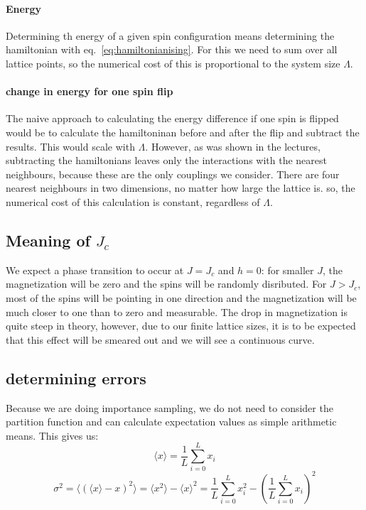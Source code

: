 \documentclass{scrartcl}
\begin{document}
\paragraph{Energy}
Determining th energy of a given spin configuration means determining the hamiltonian with eq.~\ref{eq:hamiltonianising}. For this we need to sum over all lattice points, so the numerical cost of this is proportional to the system size $\Lambda$.

\paragraph{change in energy for one spin flip}
The naive approach to calculating the energy difference if one spin is flipped would be to calculate the hamiltoninan before and after the flip and subtract the results. This would scale with $\Lambda$. However, as was shown in the lectures, subtracting the hamiltonians leaves only the interactions with the nearest neighbours, because these are the only couplings we consider. There are four nearest neighbours in two dimensions, no matter how large the lattice is. so, the numerical cost of this calculation is constant, regardless of $\Lambda$.

\subsection{Meaning of $J_c$} 
We expect a phase transition to occur at $J=J_c$ and $h=0$: for smaller $J$, the magnetization will be zero and the spins will be randomly disributed. For $J>J_c$, most of the spins will be pointing in one direction and the magnetization will be much closer to one than to zero and measurable. The drop in magnetization is quite steep in theory, however, due to our finite lattice sizes, it is to be expected that this effect will be smeared out and we will see a continuous curve.

\subsection{determining errors}

Because we are doing importance sampling, we do not need to consider the partition function and can calculate expectation values as simple arithmetic means. This gives us:
\begin{equation}
\langle x\rangle=\frac{1}{L}\sum_{i=0}^{L} x_i
\end{equation}
\begin{equation}
\sigma^2=\langle (\langle x\rangle-x)^2\rangle=\langle x^2\rangle-\langle x\rangle^2=\frac{1}{L}\sum_{i=0}^{L} x_i^2-\left( \frac{1}{L}\sum_{i=0}^{L} x_i\right) ^2
\end{equation}
\end{document}
